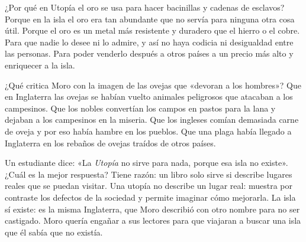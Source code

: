 \documentclass[carta,doscolumnas,compacta]{../plantilla/evaluacion}
\begin{document}
\begin{preguntas}
\begin{pregunta}[C]
¿Por qué en Utopía el oro se usa para hacer bacinillas y cadenas de esclavos?
\opcioneslargas
  {Porque en la isla el oro era tan abundante que no servía para ninguna otra cosa útil.}
  {Porque el oro es un metal más resistente y duradero que el hierro o el cobre.}
  {Para que nadie lo desee ni lo admire, y así no haya codicia ni desigualdad entre las personas.}
  {Para poder venderlo después a otros países a un precio más alto y enriquecer a la isla.}
\end{pregunta}

\begin{pregunta}[B]
¿Qué critica Moro con la imagen de las ovejas que «devoran a los hombres»?
\opcioneslargas
  {Que en Inglaterra las ovejas se habían vuelto animales peligrosos que atacaban a los campesinos.}
  {Que los nobles convertían los campos en pastos para la lana y dejaban a los campesinos en la miseria.}
  {Que los ingleses comían demasiada carne de oveja y por eso había hambre en los pueblos.}
  {Que una plaga había llegado a Inglaterra en los rebaños de ovejas traídos de otros países.}
\end{pregunta}

\begin{pregunta}[B]
Un estudiante dice: «La \emph{Utopía} no sirve para nada, porque esa isla no existe». ¿Cuál es la
mejor respuesta?
\opcioneslargas
  {Tiene razón: un libro solo sirve si describe lugares reales que se puedan visitar.}
  {Una utopía no describe un lugar real: muestra por contraste los defectos de la sociedad y permite imaginar cómo mejorarla.}
  {La isla sí existe: es la misma Inglaterra, que Moro describió con otro nombre para no ser castigado.}
  {Moro quería engañar a sus lectores para que viajaran a buscar una isla que él sabía que no existía.}
\end{pregunta}


\end{preguntas}
\end{document}
